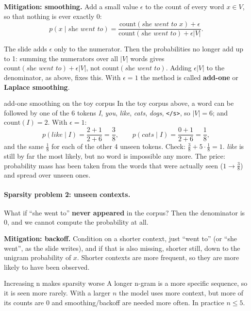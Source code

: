 \textbf{Mitigation: smoothing.} Add a small value $\epsilon$ to the count of every
word $x \in V$, so that nothing is ever exactly 0:
\[
  p(x \mid \textit{she went to}) =
  \frac{\text{count}(\textit{she went to } x) + \epsilon}
       {\text{count}(\textit{she went to}) + \epsilon |V|} .
\]

\begin{nbwarning}
The slide adds $\epsilon$ only to the numerator. Then the probabilities no longer add
up to 1: summing the numerators over all $|V|$ words gives
$\text{count}(\textit{she went to}) + \epsilon|V|$, not
$\text{count}(\textit{she went to})$. Adding $\epsilon|V|$ to the denominator, as
above, fixes this. With $\epsilon = 1$ the method is called \textbf{add-one} or
\textbf{Laplace smoothing}.
\end{nbwarning}

\begin{nbexample}{add-one smoothing on the toy corpus}
\notinslides
In the toy corpus above, a word can be followed by one of the 6 tokens
\emph{I}, \emph{you}, \emph{like}, \emph{cats}, \emph{dogs}, \texttt{</s>}, so
$|V| = 6$; and $\text{count}(\textit{I}) = 2$. With $\epsilon = 1$:
\[
  p(\textit{like} \mid \textit{I}) = \frac{2 + 1}{2 + 6} = \frac38, \qquad
  p(\textit{cats} \mid \textit{I}) = \frac{0 + 1}{2 + 6} = \frac18 ,
\]
and the same $\frac18$ for each of the other 4 unseen tokens.
Check: $\frac38 + 5 \cdot \frac18 = 1$. \emph{like} is still by far the most likely, but
no word is impossible any more. The price: probability mass has been taken from the
words that were actually seen ($1 \to \frac38$) and spread over unseen ones.
\end{nbexample}

\paragraph{Sparsity problem 2: unseen contexts.}
What if ``she went to'' \textbf{never appeared} in the corpus? Then the denominator is
0, and we cannot compute the probability at all.

\textbf{Mitigation: backoff.} Condition on a shorter context, just ``went to'' (or
``she went'', as the slide writes), and if that is also missing, shorter still, down to
the unigram probability of $x$. Shorter contexts are more frequent, so they are more
likely to have been observed.

\begin{nbfact}{Increasing n makes sparsity worse}
A longer n-gram is a more specific sequence, so it is seen more rarely. With a larger
$n$ the model uses more context, but more of its counts are 0 and smoothing/backoff
are needed more often. In practice $n \le 5$.
\end{nbfact}

